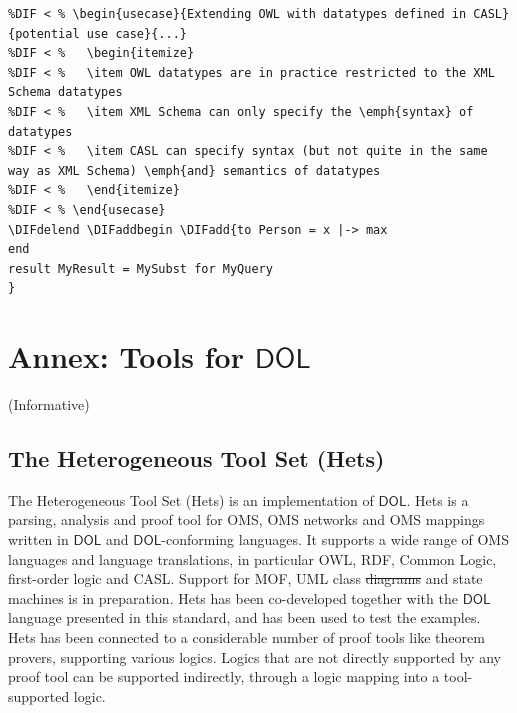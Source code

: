 \documentclass[10pt,fleqn,final]{scrreprt}
\makeatletter
\newcommand*\CommentAuthor{}
\renewcommand*\CommentAuthor{#1}}
\newcommand*\CommentDate{}
\renewcommand*\CommentDate{#1}}
\newcommand*\CommentId{}
\renewcommand*\CommentId{#1}}
\newcommand*\CommentType{}
\renewcommand*\CommentType{#1}}
\newcommand*{\SetCommentColorByType}[1]{%
\edef\localType{{#1}}%
\expandafter\ifstrequal\localType{q-aut}{\colorlet{CommentColor}{red}}{%
\expandafter\ifstrequal\localType{q-all}{\colorlet{CommentColor}{orange}}{%
\expandafter\ifstrequal\localType{todo}{\colorlet{CommentColor}{orange}}{%
\expandafter\ifstrequal\localType{fyi}{\colorlet{CommentColor}{lightgray}}{%
\colorlet{CommentColor}{yellow}}}}}}
\newcommand*{\SetCommentPrefixByType}[1]{%
\edef\localType{{#1}}%
\expandafter\@ifmtarg\localType{%
\edef\CommentPrefix{}%
}{%
\caseupper[q]{#1}%
\edef\CommentPrefix{\thestring: }%
}}
\newcommand*{\initComment}[1]{%
\setkeys{Comment}{#1}%
\SetCommentColorByType{\CommentType}%
\relax%
\SetCommentPrefixByType{\CommentType}%
\relax%
}
\newcommand*{\todonote}[2][]{%
\initComment{#1}%
\pdfcomment[author=\CommentAuthor,color=CommentColor,date=\CommentDate,id=\CommentId]{%
\CommentPrefix
#2}}
\renewcommand*{\todonote}[2][]{%
\initComment{#1}%
\ednote{\CommentPrefix #2}}
\newcommand*{\DOL}{\ensuremath{\mathsf{DOL}}\xspace}
\newcommand{\informative}[0]{{\begin{center}{\Large{(Informative})}\end{center}} \bigskip}
\newcommand{\sclause}[1]{\section{#1}}
\newcommand{\infannex}[1]{ \chapter{Annex: #1}  \informative }
\providecommand{\DIFadd}[1]{{\protect\color{blue}\uwave{#1}}} %
\providecommand{\DIFdel}[1]{{\protect\color{red}\sout{#1}}}                      %
\providecommand{\DIFaddbegin}{} %
\providecommand{\DIFaddend}{} %
\providecommand{\DIFdelbegin}{} %
\providecommand{\DIFdelend}{} %
\makeatother
\begin{document}
\begin{lstlisting}[basicstyle=\ttfamily,language=dolText,alsolanguage=CASL,escapechar=@,mathescape]
%DIFDELCMD < %%%
%DIF < % \begin{usecase}{Extending OWL with datatypes defined in CASL}{potential use case}{...}
%DIF < %   \begin{itemize}
%DIF < %   \item OWL datatypes are in practice restricted to the XML Schema datatypes
%DIF < %   \item XML Schema can only specify the \emph{syntax} of datatypes
%DIF < %   \item CASL can specify syntax (but not quite in the same way as XML Schema) \emph{and} semantics of datatypes
%DIF < %   \end{itemize}
%DIF < % \end{usecase}
\DIFdelend \DIFaddbegin \DIFadd{to Person = x |-> max
end
result MyResult = MySubst for MyQuery
}\end{lstlisting}
\DIFaddend 


\infannex{Tools for \DOL}\label{a:tools}

\sclause{The Heterogeneous Tool Set (Hets)}\label{a:hets} The
Heterogeneous Tool Set (Hets) is  an implementation  of
\DOL. Hets is a parsing, analysis and proof tool
for OMS, OMS networks and OMS mappings written in \DOL and
\DOL-conforming languages.  It supports a wide range of OMS languages
and language translations, in particular OWL, RDF, Common Logic,
first-order logic and CASL. Support for MOF, UML class \DIFdelbegin \DIFdel{diagrams }\DIFdelend \DIFaddbegin \DIFadd{models }\DIFaddend and
state machines is in preparation.  Hets has been co-developed together
with the \DOL language presented in this standard, and has been used to
test the examples. Hets has been connected to a considerable number of
proof tools like theorem provers, supporting various logics. Logics
that are not directly supported by any proof tool can be supported
indirectly, through a logic mapping into a tool-supported logic.
\end{document}
